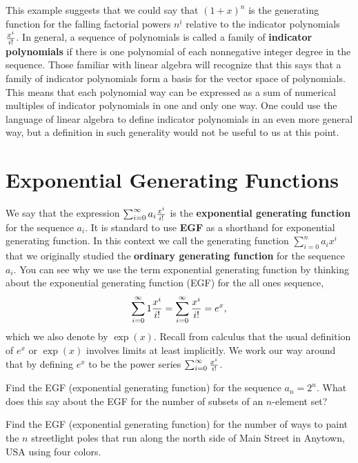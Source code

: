 This example suggests that we could say that $(1+x)^n$
is the generating function for the falling factorial powers
$n^{\underline{i}}$ relative to the indicator polynomials $x^i\over i!$. 
In general, a sequence  of polynomials is called a family of {\bf
indicator polynomials} if there is one polynomial of each nonnegative
integer degree in the sequence.  Those familiar with linear algebra will
recognize that this says that a family of indicator polynomials form a
basis for the vector space of polynomials.  This means that each
polynomial way can be expressed as a sum of numerical multiples of
indicator polynomials in one and only one way.  One could use the
language of linear algebra to define indicator polynomials in an even
more general way, but a definition in such generality would not be useful
to us at this point.  

\section{Exponential Generating Functions}
We say that the expression $\sum_{i=0}^\infty a_i{x^i\over i!}$ is the
{\bf exponential generating function} for the sequence
$a_i$.  It is standard to use {\bf EGF} as a shorthand for
exponential generating function.  In this context we call the generating
function
$\sum_{i=0}^n a_ix^i$ that we originally studied the {\bf ordinary
generating function} for the sequence
$a_i$.  You can see why we use the term exponential generating function
by thinking about the exponential generating function (EGF) for the all
ones sequence,
$$\sum_{i=0}^\infty 1{x^i\over i!} = \sum_{i=0}^\infty {x^i\over i!}
=e^x,$$
which we also denote by $\exp (x)$.  Recall from calculus that the usual
definition of
$e^x$ or $\exp(x)$ involves limits at least implicitly.  We work our way
around that by defining $e^x$ to be the power series $ \sum_{i=0}^\infty
{x^i\over i!}$.

\bp 

\itemm Find the EGF (exponential generating function) for the sequence
$a_n=2^n$.  What does this say about the EGF
for the number of subsets of an $n$-element set?

\itemm Find the EGF (exponential generating function) for the number of
ways to paint the $n$ streetlight poles that run along the north side of
Main Street in Anytown, USA using four colors.\label{paintinglightpoles}


